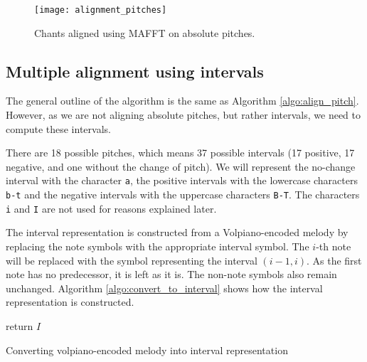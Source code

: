 \begin{figure}[h]
\centering
\texttt{[image: alignment\_pitches]}
\caption{Chants aligned using MAFFT on absolute pitches.}
\label{fig:align_pitches}
\end{figure}

\subsection{Multiple alignment using intervals}

The general outline of the algorithm is the same as Algorithm \ref{algo:align_pitch}. However, as we are not aligning absolute pitches, but rather intervals,
we need to compute these intervals.

There are 18 possible pitches, which means 37 possible intervals (17 positive, 17 negative, and one without the change of pitch). We will represent the no-change interval
with the character \verb|a|, the positive intervals with the lowercase characters \verb|b-t| and the negative intervals with the uppercase characters \verb|B-T|. The characters
\verb|i| and \verb|I| are not used for reasons explained later.

The interval representation is constructed from a Volpiano-encoded melody by replacing the note symbols with the appropriate interval symbol. The $i$-th note will be
replaced with the symbol representing the interval $(i-1, i)$. As the first note has no predecessor, it is left as it is. The non-note symbols also remain unchanged.
Algorithm \ref{algo:convert_to_interval} shows how the interval representation is constructed.\newline

\begin{algorithm}[H]
    \BlankLine
    return $I$\;
    \caption{Converting volpiano-encoded melody into interval representation}
    \label{algo:convert_to_interval}
\end{algorithm}


